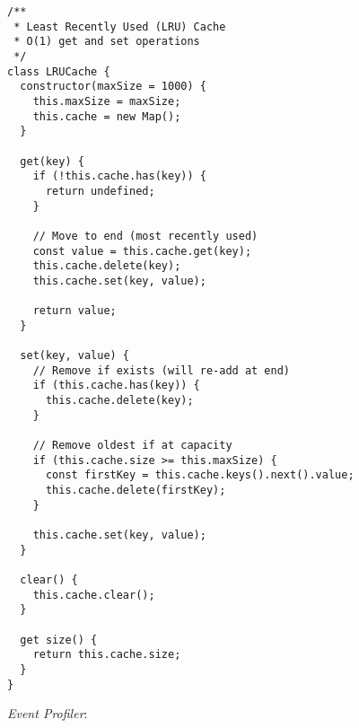 \documentclass[11pt]{article}
\begin{document}
\begin{verbatim}
/**
 * Least Recently Used (LRU) Cache
 * O(1) get and set operations
 */
class LRUCache {
  constructor(maxSize = 1000) {
    this.maxSize = maxSize;
    this.cache = new Map();
  }
  
  get(key) {
    if (!this.cache.has(key)) {
      return undefined;
    }
    
    // Move to end (most recently used)
    const value = this.cache.get(key);
    this.cache.delete(key);
    this.cache.set(key, value);
    
    return value;
  }
  
  set(key, value) {
    // Remove if exists (will re-add at end)
    if (this.cache.has(key)) {
      this.cache.delete(key);
    }
    
    // Remove oldest if at capacity
    if (this.cache.size >= this.maxSize) {
      const firstKey = this.cache.keys().next().value;
      this.cache.delete(firstKey);
    }
    
    this.cache.set(key, value);
  }
  
  clear() {
    this.cache.clear();
  }
  
  get size() {
    return this.cache.size;
  }
}
\end{verbatim}

\emph{Event Profiler}:
\end{document}
